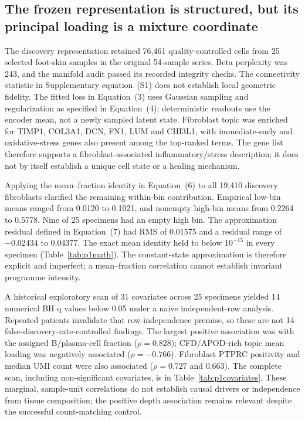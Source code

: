 \documentclass[10pt,a4paper]{article}
\begin{document}

\subsection{The frozen representation is structured, but its principal loading is a mixture coordinate}
The discovery representation retained 76,461 quality-controlled cells from 25 selected foot-skin samples in the original 54-sample series. Beta perplexity was 243, and the manifold audit passed its recorded integrity checks. The connectivity statistic in Supplementary equation~(S1) does not establish local geometric fidelity. The fitted loss in Equation~(3) uses Gaussian sampling and regularization as specified in Equation~(4); deterministic readouts use the encoder mean, not a newly sampled latent state. Fibroblast topic was enriched for TIMP1, COL3A1, DCN, FN1, LUM and CHI3L1, with immediate-early and oxidative-stress genes also present among the top-ranked terms. The gene list therefore supports a fibroblast-associated inflammatory/stress description; it does not by itself establish a unique cell state or a healing mechanism.

Applying the mean--fraction identity in Equation~(6) to all 19,410 discovery fibroblasts clarified the remaining within-bin contribution. Empirical low-bin means ranged from 0.0120 to 0.1021, and nonempty high-bin means from 0.2264 to 0.5778. Nine of 25 specimens had an empty high bin. The approximation residual defined in Equation~(7) had RMS of 0.01575 and a residual range of $-0.02434$ to $0.04377$. The exact mean identity held to below $10^{-15}$ in every specimen (Table~\ref{tab:p1math}). The constant-state approximation is therefore explicit and imperfect; a mean--fraction correlation cannot establish invariant programme intensity.

A historical exploratory scan of 31 covariates across 25 specimens yielded 14 numerical BH q values below 0.05 under a naive independent-row analysis. Repeated patients invalidate that row-independence premise, so these are not 14 false-discovery-rate-controlled findings. The largest positive association was with the assigned B/plasma-cell fraction ($\rho=0.828$); CFD/APOD-rich topic mean loading was negatively associated ($\rho=-0.766$). Fibroblast PTPRC positivity and median UMI count were also associated ($\rho=0.727$ and 0.663). The complete scan, including non-significant covariates, is in Table~\ref{tab:p1covariates}. These marginal, sample-unit correlations do not establish causal drivers or independence from tissue composition; the positive depth association remains relevant despite the successful count-matching control.
\end{document}

